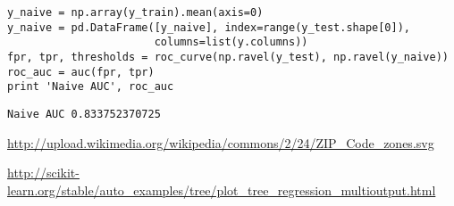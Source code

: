 \documentclass[12pt,fleqn]{article}\usepackage{../common}
\begin{document}
\begin{verbatim}
y_naive = np.array(y_train).mean(axis=0)
y_naive = pd.DataFrame([y_naive], index=range(y_test.shape[0]), 
                       columns=list(y.columns))
fpr, tpr, thresholds = roc_curve(np.ravel(y_test), np.ravel(y_naive))
roc_auc = auc(fpr, tpr)
print 'Naive AUC', roc_auc
\end{verbatim}

\begin{verbatim}
Naive AUC 0.833752370725
\end{verbatim}








\url{http://upload.wikimedia.org/wikipedia/commons/2/24/ZIP_Code_zones.svg}

\url{http://scikit-learn.org/stable/auto_examples/tree/plot_tree_regression_multioutput.html}
\end{document}
